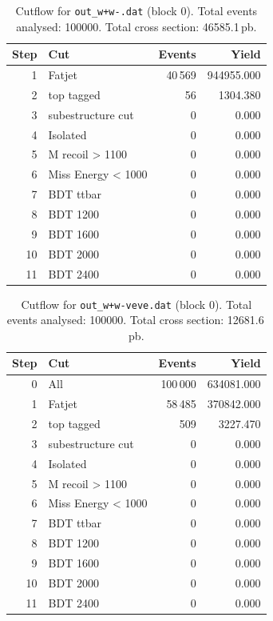 \documentclass{article}
\begin{document}
\begin{table}[H]
\centering
\begin{tabular}{r l r r}
\toprule
Step & Cut & Events & Yield \\
\midrule
1 & Fatjet & 40\,569 & 944955.000 \\
2 & top tagged & 56 & 1304.380 \\
3 & subestructure cut & 0 & 0.000 \\
4 & Isolated & 0 & 0.000 \\
5 & M recoil > 1100 & 0 & 0.000 \\
6 & Miss Energy < 1000 & 0 & 0.000 \\
7 & BDT ttbar & 0 & 0.000 \\
8 & BDT 1200 & 0 & 0.000 \\
9 & BDT 1600 & 0 & 0.000 \\
10 & BDT 2000 & 0 & 0.000 \\
11 & BDT 2400 & 0 & 0.000 \\
\bottomrule
\end{tabular}
\caption{Cutflow for \texttt{out\_w+w-.dat} (block 0). Total events analysed: 100000. Total cross section: 46585.1\,pb.}
\label{tab:cutflow-out-w-w-dat}
\end{table}

\begin{table}[H]
\centering
\begin{tabular}{r l r r}
\toprule
Step & Cut & Events & Yield \\
\midrule
0 & All & 100\,000 & 634081.000 \\
1 & Fatjet & 58\,485 & 370842.000 \\
2 & top tagged & 509 & 3227.470 \\
3 & subestructure cut & 0 & 0.000 \\
4 & Isolated & 0 & 0.000 \\
5 & M recoil > 1100 & 0 & 0.000 \\
6 & Miss Energy < 1000 & 0 & 0.000 \\
7 & BDT ttbar & 0 & 0.000 \\
8 & BDT 1200 & 0 & 0.000 \\
9 & BDT 1600 & 0 & 0.000 \\
10 & BDT 2000 & 0 & 0.000 \\
11 & BDT 2400 & 0 & 0.000 \\
\bottomrule
\end{tabular}
\caption{Cutflow for \texttt{out\_w+w-veve.dat} (block 0). Total events analysed: 100000. Total cross section: 12681.6\,pb.}
\label{tab:cutflow-out-w-w-veve-dat}
\end{table}
\end{document}
